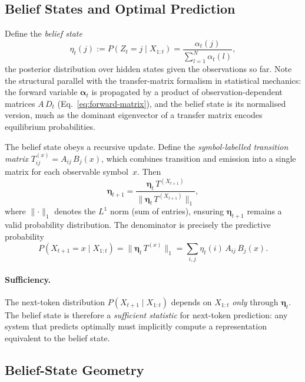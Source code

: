 \documentclass[11pt]{article}
\begin{document}
\subsection{Belief States and Optimal Prediction}\label{sec:belief}

Define the \emph{belief state}
\begin{equation}\label{eq:belief-def}
  \eta_t(j)
  := P(Z_t{=}j \mid X_{1:t})
  = \frac{\alpha_t(j)}{\sum_{l=1}^{N} \alpha_t(l)},
\end{equation}
the posterior distribution over hidden states given the observations so far.  Note the structural parallel with the transfer-matrix formalism in statistical mechanics: the forward variable $\boldsymbol{\alpha}_t$ is propagated by a product of observation-dependent matrices $A\,D_t$ (Eq.~\ref{eq:forward-matrix}), and the belief state is its normalised version, much as the dominant eigenvector of a transfer matrix encodes equilibrium probabilities.

The belief state obeys a recursive update.  Define the \emph{symbol-labelled transition matrix} $T^{(x)}_{ij} = A_{ij}\, B_j(x)$, which combines transition and emission into a single matrix for each observable symbol~$x$.  Then
\begin{equation}\label{eq:belief-update}
  \boldsymbol{\eta}_{t+1}
  = \frac{\boldsymbol{\eta}_t\, T^{(X_{t+1})}}
         {\lVert \boldsymbol{\eta}_t\, T^{(X_{t+1})} \rVert_1},
\end{equation}
where $\lVert \cdot \rVert_1$ denotes the $L^1$ norm (sum of entries), ensuring $\boldsymbol{\eta}_{t+1}$ remains a valid probability distribution.  The denominator is precisely the predictive probability
\begin{equation}\label{eq:predictive}
  P(X_{t+1}{=}x \mid X_{1:t})
  = \lVert \boldsymbol{\eta}_t\, T^{(x)} \rVert_1
  = \sum_{i,j} \eta_t(i)\, A_{ij}\, B_j(x).
\end{equation}

\paragraph{Sufficiency.}
The next-token distribution $P(X_{t+1} \mid X_{1:t})$ depends on $X_{1:t}$ \emph{only} through $\boldsymbol{\eta}_t$.  The belief state is therefore a \emph{sufficient statistic} for next-token prediction: any system that predicts optimally must implicitly compute a representation equivalent to the belief state.

\subsection{Belief-State Geometry}\label{sec:geometry}
\end{document}
